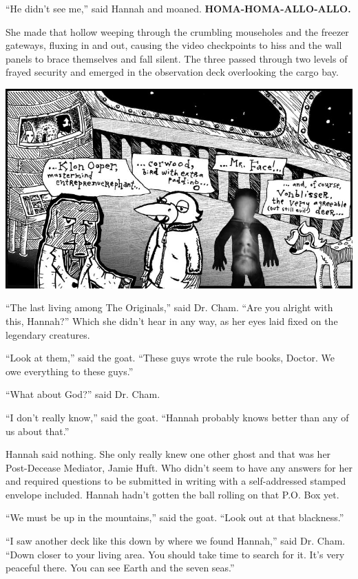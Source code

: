 \documentclass[10pt,twoside]{report}
\begin{document}
``He didn't see me,'' said Hannah and moaned.  {\bf
  HOMA-HOMA-ALLO-ALLO.}

She made that hollow weeping through the crumbling mouseholes and the
freezer gateways, fluxing in and out, causing the video checkpoints to
hiss and the wall panels to brace themselves and fall silent.  The
three passed through two levels of frayed security and emerged in the
observation deck overlooking the cargo bay.

	\includegraphics[width=1.0\textwidth]{cache/51.png}

``The last living among The Originals,'' said Dr. Cham.  ``Are you
        alright with this, Hannah?''  Which she didn't hear in any
        way, as her eyes laid fixed on the legendary creatures.

``Look at them,'' said the goat.  ``These guys wrote the rule books,
        Doctor.  We owe everything to these guys.''

``What about God?'' said Dr. Cham.

``I don't really know,'' said the goat.  ``Hannah probably knows
        better than any of us about that.''

Hannah said nothing.  She only really knew one other ghost and that
was her Post-Decease Mediator, Jamie Huft.  Who didn't seem to have
any answers for her and required questions to be submitted in writing
with a self-addressed stamped envelope included.  Hannah hadn't gotten
the ball rolling on that P.O. Box yet.

``We must be up in the mountains,'' said the goat.  ``Look out at that
blackness.''

``I saw another deck like this down by where we found Hannah,'' said
Dr. Cham.  ``Down closer to your living area.  You should take time to
search for it.  It's very peaceful there. You can see Earth and the
seven seas.''
\end{document}
